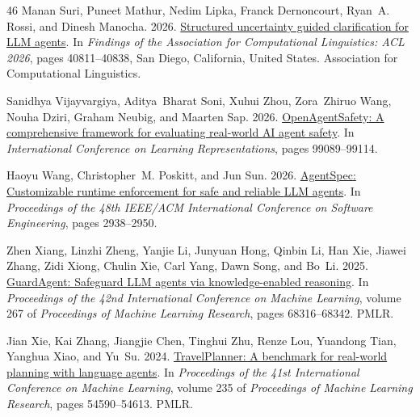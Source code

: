 \documentclass[11pt]{article}
\begin{document}
\begin{thebibliography}{46}
Manan Suri, Puneet Mathur, Nedim Lipka, Franck Dernoncourt, Ryan~A. Rossi, and Dinesh Manocha. 2026.
\newblock \href {https://doi.org/10.18653/v1/2026.findings-acl.2028} {Structured uncertainty guided clarification for {LLM} agents}.
\newblock In \emph{Findings of the {A}ssociation for {C}omputational {L}inguistics: {ACL} 2026}, pages 40811--40838, San Diego, California, United States. Association for Computational Linguistics.

Sanidhya Vijayvargiya, Aditya~Bharat Soni, Xuhui Zhou, Zora~Zhiruo Wang, Nouha Dziri, Graham Neubig, and Maarten Sap. 2026.
\newblock \href {https://proceedings.iclr.cc/paper_files/paper/2026/hash/a0f6c06b8d6114bb37688c2dc19b4d74-Abstract-Conference.html} {{OpenAgentSafety}: A comprehensive framework for evaluating real-world {AI} agent safety}.
\newblock In \emph{International Conference on Learning Representations}, pages 99089--99114.

Haoyu Wang, Christopher~M. Poskitt, and Jun Sun. 2026.
\newblock \href {https://doi.org/10.1145/3744916.3764546} {{AgentSpec}: Customizable runtime enforcement for safe and reliable {LLM} agents}.
\newblock In \emph{Proceedings of the 48th IEEE/ACM International Conference on Software Engineering}, pages 2938--2950.

Zhen Xiang, Linzhi Zheng, Yanjie Li, Junyuan Hong, Qinbin Li, Han Xie, Jiawei Zhang, Zidi Xiong, Chulin Xie, Carl Yang, Dawn Song, and Bo~Li. 2025.
\newblock \href {https://proceedings.mlr.press/v267/xiang25a.html} {{G}uard{A}gent: Safeguard {LLM} agents via knowledge-enabled reasoning}.
\newblock In \emph{Proceedings of the 42nd International Conference on Machine Learning}, volume 267 of \emph{Proceedings of Machine Learning Research}, pages 68316--68342. PMLR.

Jian Xie, Kai Zhang, Jiangjie Chen, Tinghui Zhu, Renze Lou, Yuandong Tian, Yanghua Xiao, and Yu~Su. 2024.
\newblock \href {https://proceedings.mlr.press/v235/xie24j.html} {{T}ravel{P}lanner: A benchmark for real-world planning with language agents}.
\newblock In \emph{Proceedings of the 41st International Conference on Machine Learning}, volume 235 of \emph{Proceedings of Machine Learning Research}, pages 54590--54613. PMLR.


\end{thebibliography}
\end{document}
